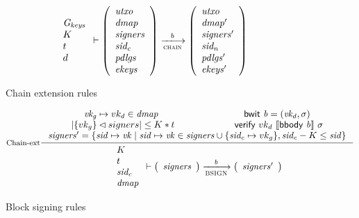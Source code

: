 \begin{figure}
\begin{equation}
{{\begin{array}{l}
         \Gkeys\\
         K\\
         t\\
         d
      \end{array}}
      \vdash
      {
        \left(
          \begin{array}{l}
            \var{utxo}\\
            \var{dmap}\\
            \var{signers}\\
            \var{sid_c}\\
            \var{pdlgs}\\
            \var{ekeys}
          \end{array}
        \right)
      }
      \trans{chain}{b}
      {
        \left(
          \begin{array}{l}
            \var{utxo}\\
            \var{dmap'}\\
            \var{signers'}\\
            \var{sid_n}\\
            \var{pdlgs'}\\
            \var{ekeys'}
          \end{array}
        \right)
      }
    }
  \end{equation}
  \caption{Chain extension rules}
  \label{fig:rules:chain-extension}
\end{figure}


\begin{figure}
  \begin{equation}
    \label{eq:rule:block-signing}
    \inference[Chain-ext]
    {\var{vk_g} \mapsto vk_d \in \var{dmap} & \bwit{b} = (\var{vk_d}, \sigma)\\
      \size{\{vk_g\} \restrictdom signers} \leq K * t &
      \verify{vk_d}{\serialised{\bbody{b}}}{\sigma} \\
      \var{signers'} =
         \{ \var{sid} \mapsto \var{vk}
          \mid  \var{sid} \mapsto \var{vk} \in \var{signers} \cup \{\var{sid_c} \mapsto vk_g\}
          , \var{sid_c} - K \leq \var{sid} \}
    }
    {
      {\begin{array}{l}
         K\\
         t\\
         \var{sid_c}\\
         \var{dmap}
      \end{array}}
      \vdash
      {
        \left(
          \begin{array}{l}
            \var{signers}
          \end{array}
        \right)
      }
      \trans{BSIGN}{b}
      {
        \left(
          \begin{array}{l}
            \var{signers'}
          \end{array}
        \right)
      }
    }
  \end{equation}
  \caption{Block signing rules}
  \label{fig:rules:block-signing}
\end{figure}

